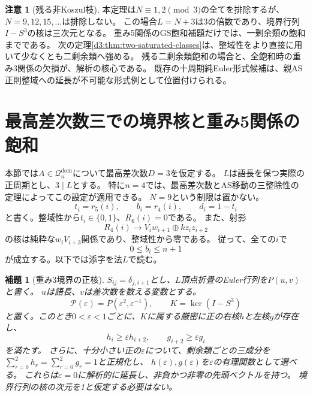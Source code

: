 \documentclass[11pt,a4paper]{ltjsarticle}
\newtheorem{lemma}[theorem]{補題}
\theoremstyle{definition}
\newtheorem{remark}[theorem]{注意}
\begin{document}
\begin{remark}[残る非Koszul枝]
本定理は$N\equiv1,2\pmod3$の全てを排除するが、$N=9,12,15,\ldots$は排除しない。
この場合$L=N+3$は3の倍数であり、境界行列$I-S^3$の核は三次元となる。
重み5関係のGS飽和補題だけでは、一剰余類の飽和までである。
次の定理\ref{d3:thm:two-saturated-classes}は、整域性をより直接に用いて少なくとも二剰余類へ強める。
残る二剰余類飽和の場合と、全飽和時の重み3関係の欠損が、解析の核心である。
既存の十周期純Euler形式候補は、親AS正則整域への延長が不可能な形式例として位置付けられる。
\end{remark}

\section{最高差次数三での境界核と重み5関係の飽和}\label{d3:sec:boundary}

本節では$A\in\mathcal Q_n^{\mathrm{dom}}$について最高差次数$D=3$を仮定する。
$L$は語長を保つ実際の正周期とし、$3\mid L$とする。
特に$n=4$では、最高差次数とAS移動の三整除性の定理によってこの設定が適用できる。
$N=9$という制限は置かない。
\[
t_i=r_5(i),\qquad b_i=r_4(i),\qquad d_i=1-t_i
\]
と書く。整域性から$t_i\in\{0,1\}$、$R_6(i)=0$である。
また、射影
\[
R_4(i)\longrightarrow V_iw_{i+1}\oplus kz_i z_{i+2}
\]
の核は純粋な$w_iV_{i+3}$関係であり、整域性から零である。
従って、全ての$i$で
\begin{equation}\label{d3:eq:r4-upper}
0\le b_i\le n+1
\end{equation}
が成立する。以下では添字を法$L$で読む。

\begin{lemma}[重み3境界の正核]
\label{d3:lem:boundary-kernel}
$S_{ij}=\delta_{j,i+1}$とし、$L$頂点折畳のEuler行列を$P(u,v)$と書く。
$u$は語長、$v$は差次数を数える変数とする。
\[
\mathscr P(\varepsilon)=P(\varepsilon^2,\varepsilon^{-1}),\qquad
K=\ker(I-S^3)
\]
と置く。このとき$0<\varepsilon<1$ごとに、$K$に属する厳密に正の右核$h$と左核$g$が存在し、
\begin{equation}\label{d3:eq:z-kernel-inequalities}
h_i\ge\varepsilon h_{i+2},\qquad
g_{i+2}\ge\varepsilon g_i
\end{equation}
を満たす。
さらに、十分小さい正の$\varepsilon$について、剰余類ごとの三成分を
$\sum_{r=0}^2h_r=\sum_{r=0}^2g_r=1$と正規化し、
$h(\varepsilon),g(\varepsilon)$を$\varepsilon$の有理関数として選べる。
これらは$\varepsilon=0$に解析的に延長し、非負かつ非零の先頭ベクトルを持つ。
境界行列の核の次元を1と仮定する必要はない。
\end{lemma}
\end{document}
